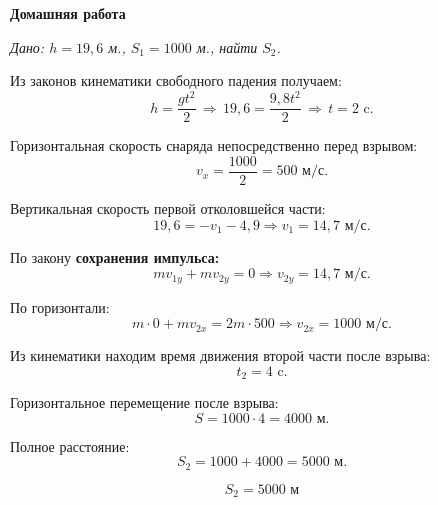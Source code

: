 \documentclass[a4paper,12pt]{article}
\begin{document}
\begin{center}
    \textbf{Домашняя работа }
\end{center}

\textit{Дано: $h = 19{,}6$ м., $S_1=1000$ м., найти $S_2$.}
\begin{figure}[h]
    \centering
\end{figure}

Из законов кинематики свободного падения получаем:
\[
h = \frac{g t^2}{2} \, \Rightarrow \, 19{,}6 = \frac{9{,}8 t^2}{2}
\, \Rightarrow \,
t = 2 \text{ c}.
\]

Горизонтальная скорость снаряда непосредственно перед взрывом:
\[
v_x = \frac{1000}{2} = 500 \text{ м/с}.
\]

Вертикальная скорость первой отколовшейся части:
\[
19{,}6 = - v_1 - 4{,}9
\Rightarrow
v_1 = 14{,}7 \text{ м/с}.
\]

По закону \textbf{сохранения импульса:}
\[
m v_{1y} + m v_{2y} = 0
\Rightarrow
v_{2y} = 14{,}7 \text{ м/с}.
\]

По горизонтали:
\[
m \cdot 0 + m v_{2x} = 2m \cdot 500
\Rightarrow
v_{2x} = 1000 \text{ м/с}.
\]

Из кинематики находим время движения второй части после взрыва:
\[
t_2 = 4 \text{ c}.
\]

Горизонтальное перемещение после взрыва:
\[
S = 1000 \cdot 4 = 4000 \text{ м}.
\]

Полное расстояние:
\[
S_2 = 1000 + 4000 = 5000 \text{ м}.
\]

\[
\boxed{S_2 = 5000 \text{ м}}
\]
\end{document}
